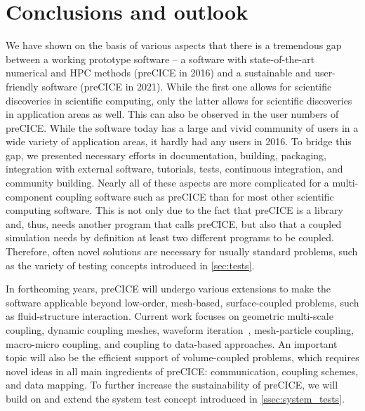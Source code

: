 \section{Conclusions and outlook}
\label{sec:conclusion}



We have shown on the basis of various aspects that there is a tremendous gap between a working prototype software -- a software with state-of-the-art numerical and HPC methods (preCICE in 2016) and a sustainable and user-friendly software (preCICE in 2021). While the first one allows for scientific discoveries in scientific computing, only the latter allows for scientific discoveries in application areas as well. This can also be observed in the user numbers of preCICE. While the software today has a large and vivid community of users in a wide variety of application areas, it hardly had any users in 2016.
To bridge this gap, we presented necessary efforts in documentation, building, packaging, integration with external software, tutorials, tests, continuous integration, and community building.
Nearly all of these aspects are more complicated for a multi-component coupling software such as preCICE than for most other scientific computing software. This is not only due to the fact that preCICE is a library and, thus, needs another program that calls preCICE, but also that a coupled simulation needs by definition at least two different programs to be coupled. Therefore, often novel solutions are necessary for usually standard problems, such as the variety of testing concepts introduced in \autoref{sec:tests}.  

In forthcoming years, preCICE will undergo various extensions to make the software applicable beyond low-order, mesh-based, surface-coupled problems, such as fluid-structure interaction. Current work focuses on geometric multi-scale coupling, dynamic coupling meshes, waveform iteration~\cite{QNWI}, mesh-particle coupling, macro-micro coupling, and coupling to data-based approaches. An important topic will also be the efficient support of volume-coupled problems, which requires novel ideas in all main ingredients of preCICE: communication, coupling schemes, and data mapping.
To further increase the sustainability of preCICE, we will build on and extend the system test concept introduced in \autoref{ssec:system_tests}.



